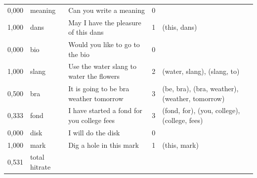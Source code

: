 \documentclass[a4paper,12pt]{article}
\begin{document}
\begin{landscape}
\begin{longtable}{l l l r l}
0,000 & meaning & Can you write a meaning & 0 &  \\
1,000 & dans & May I have the pleasure of this dans & 1 & (this, dans) \\
0,000 & bio & Would you like to go to the bio & 0 &  \\
1,000 & slang & Use the water slang to water the flowers & 2 & (water, slang), (slang, to) \\
0,500 & bra & It is going to be bra weather tomorrow & 3 & (be, bra), (bra, weather), (weather, tomorrow) \\
0,333 & fond & I have started a fond for you college fees & 3 & (fond, for), (you, college), (college, fees) \\
0,000 & disk & I will do the disk & 0 &  \\
1,000 & mark & Dig a hole in this mark & 1 & (this, mark) \\
\hline
0,531 & total hitrate
\label{tab:resultincorrect}
\end{longtable}
\end{landscape}
\end{document}
